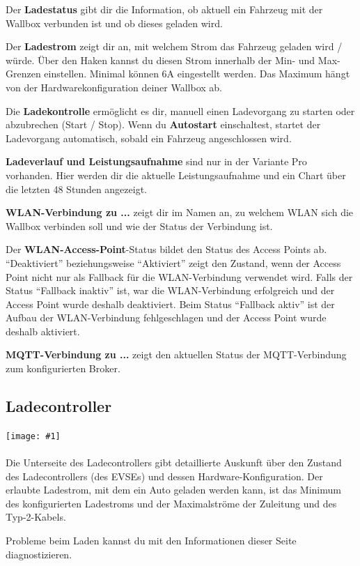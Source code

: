 \documentclass[a4paper,10pt]{article}
\newcommand{\gfx}[1]{\texttt{[image: \#1]}}
\begin{document}
\begin{multicols*}{2}
	Der \textbf{Ladestatus} gibt dir die Information, ob aktuell ein
	Fahrzeug mit der Wallbox verbunden ist und ob dieses geladen wird.

	Der \textbf{Ladestrom} zeigt dir an, mit welchem Strom das Fahrzeug geladen
	wird / würde. Über den Haken kannst du diesen Strom innerhalb der Min-
	und Max-Grenzen einstellen. Minimal können 6A eingestellt werden. Das
	Maximum hängt von der Hardwarekonfiguration deiner Wallbox ab.

	Die \textbf{Ladekontrolle} ermöglicht es dir, manuell einen Ladevorgang zu
	starten oder abzubrechen (Start / Stop). Wenn du \textbf{Autostart}
	einschaltest, startet der Ladevorgang automatisch, sobald ein Fahrzeug
	angeschlossen wird.

	\textbf{Ladeverlauf und Leistungsaufnahme} sind nur in der Variante Pro
	vorhanden. Hier werden dir die aktuelle Leistungsaufnahme und ein Chart über
	die letzten 48 Stunden angezeigt.

	\textbf{WLAN-Verbindung zu ...} zeigt dir im Namen an, zu welchem WLAN
	sich die Wallbox verbinden soll und wie der Status der Verbindung ist.

	Der \textbf{WLAN-Access-Point}-Status bildet den Status des Access Points ab.
	\enquote{Deaktiviert} beziehungsweise \enquote{Aktiviert} zeigt den Zustand, wenn der Access Point nicht
	nur als Fallback für die WLAN-Verbindung verwendet wird. Falls der Status \enquote{Fallback inaktiv} ist,
	war die WLAN-Verbindung erfolgreich und der Access Point wurde deshalb deaktiviert.
	Beim Status \enquote{Fallback aktiv} ist der Aufbau der WLAN-Verbindung fehlgeschlagen und der
	Access Point wurde deshalb aktiviert.

	\textbf{MQTT-Verbindung zu ...} zeigt den aktuellen Status der MQTT-Verbindung
	zum konfigurierten Broker.

	\subsection{Ladecontroller}
	\gfx{./img_warp2/resized/web_evse2}
	\\\\
	Die Unterseite des Ladecontrollers gibt detaillierte Auskunft über den Zustand
	des Ladecontrollers (des EVSEs) und dessen Hardware-Konfiguration. Der
	erlaubte Ladestrom, mit dem ein Auto geladen werden kann, ist das Minimum des
	konfigurierten Ladestroms und der Maximalströme der Zuleitung und des Typ-2-Kabels.

	Probleme beim Laden kannst du mit den Informationen dieser
	Seite diagnostizieren.


\end{multicols*}
\end{document}
